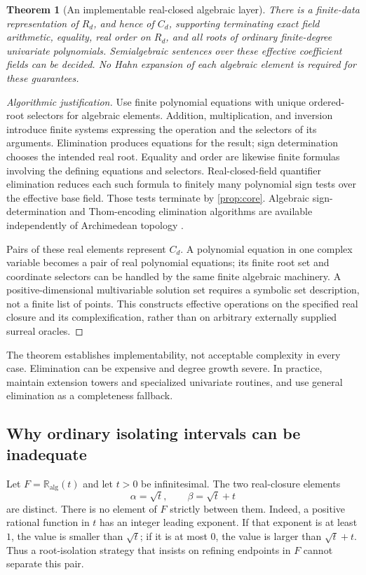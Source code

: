 \documentclass[11pt,letterpaper]{article}
\newtheorem{theorem}{Theorem}[section]
\theoremstyle{definition}
\newcommand{\RA}{\mathbb R_{\mathrm{alg}}}
\numberwithin{equation}{section}
\begin{document}
\begin{theorem}[An implementable real-closed algebraic layer]\label{thm:realclosure}
There is a finite-data representation of $R_d$, and hence of $C_d$, supporting terminating exact field arithmetic, equality, real order on $R_d$, and all roots of ordinary finite-degree univariate polynomials. Semialgebraic sentences over these effective coefficient fields can be decided. No Hahn expansion of each algebraic element is required for these guarantees.
\end{theorem}
\begin{proof}[Algorithmic justification]
Use finite polynomial equations with unique ordered-root selectors for algebraic elements. Addition, multiplication, and inversion introduce finite systems expressing the operation and the selectors of its arguments. Elimination produces equations for the result; sign determination chooses the intended real root. Equality and order are likewise finite formulas involving the defining equations and selectors. Real-closed-field quantifier elimination reduces each such formula to finitely many polynomial sign tests over the effective base field. Those tests terminate by \cref{prop:core}. Algebraic sign-determination and Thom-encoding elimination algorithms are available independently of Archimedean topology \cite{PerrucciRoy}.

Pairs of these real elements represent $C_d$. A polynomial equation in one complex variable becomes a pair of real polynomial equations; its finite root set and coordinate selectors can be handled by the same finite algebraic machinery. A positive-dimensional multivariable solution set requires a symbolic set description, not a finite list of points. This constructs effective operations on the specified real closure and its complexification, rather than on arbitrary externally supplied surreal oracles.
\end{proof}
The theorem establishes implementability, not acceptable complexity in every case. Elimination can be expensive and degree growth severe. In practice, maintain extension towers and specialized univariate routines, and use general elimination as a completeness fallback.

\subsection{Why ordinary isolating intervals can be inadequate}
Let $F=\RA(t)$ and let $t>0$ be infinitesimal. The two real-closure elements
\[
 \alpha=\sqrt t,\qquad \beta=\sqrt t+t
\]
are distinct. There is no element of $F$ strictly between them. Indeed, a positive rational function in $t$ has an integer leading exponent. If that exponent is at least $1$, the value is smaller than $\sqrt t$; if it is at most $0$, the value is larger than $\sqrt t+t$. Thus a root-isolation strategy that insists on refining endpoints in $F$ cannot separate this pair.
\end{document}
